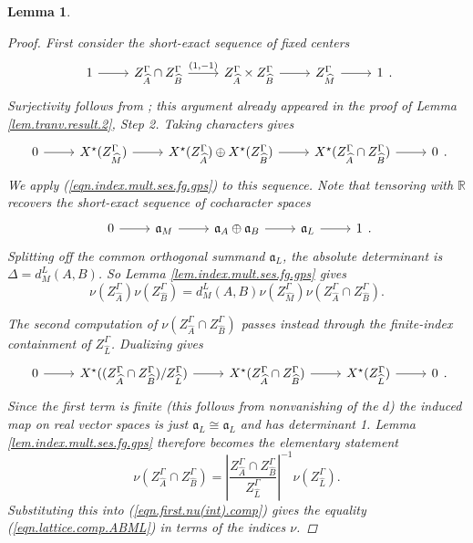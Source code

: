 \documentclass[openany]{amsbook}
\newtheorem{lemma}[theorem]{Lemma}
\theoremstyle{definition}
\theoremstyle{remark}
\numberwithin{equation}{section}
\newcommand{\R}{\mathbb{R}}
\renewcommand{\-}{\operatorname{-}}
\renewcommand{\a}{\mathfrak{a}}
\begin{document}
\begin{lemma}
\begin{proof}
        First consider the short-exact sequence of fixed centers
        $$
            \begin{tikzcd}
                1 \ar[r] & Z_{\widehat{A}}^\Gamma \cap Z_{\widehat{B}}^\Gamma \ar[r, "{(1, -1)}"] & Z_{\widehat{A}}^\Gamma \times Z_{\widehat{B}}^\Gamma \ar[r] & Z_{\widehat{M}}^\Gamma \ar[r] & 1
            \end{tikzcd}.
        $$
        Surjectivity follows from \cite[Lemma 1.1]{arthurtransferwoi}; this argument already appeared in the proof of Lemma \ref{lem.tranv.result.2}, Step 2. Taking characters gives
        $$
            \begin{tikzcd}
                0 \ar[r] & X^\star(Z_{\widehat{M}}^\Gamma) \ar[r] & X^\star(Z_{\widehat{A}}^\Gamma) \oplus X^\star(Z_{\widehat{B}}^\Gamma) \ar[r] & X^\star(Z_{\widehat{A}}^\Gamma \cap Z_{\widehat{B}}^\Gamma) \ar[r] & 0
            \end{tikzcd}.
        $$
        We apply (\ref{eqn.index.mult.ses.fg.gps}) to this sequence. Note that tensoring with $\R$ recovers the short-exact sequence of cocharacter spaces
        $$
            \begin{tikzcd}
                0 \ar[r] & \a_M \ar[r] & \a_A \oplus \a_B \ar[r] & \a_L \ar[r] & 1
            \end{tikzcd}.
        $$
        Splitting off the common orthogonal summand $\a_L$, the absolute determinant is $\Delta = d_M^L(A,B)$. So Lemma \ref{lem.index.mult.ses.fg.gps} gives
    \begin{equation}
            \nu(Z_{\widehat{A}}^\Gamma) \nu(Z_{\widehat{B}}^\Gamma) = d_M^L(A,B) \nu(Z_{\widehat{M}}^\Gamma) \nu(Z_{\widehat{A}}^\Gamma \cap Z_{\widehat{B}}^\Gamma).\label{eqn.first.nu(int).comp}
        \end{equation}

        The second computation of $\nu(Z_{\widehat{A}}^\Gamma \cap Z_{\widehat{B}}^\Gamma)$ passes instead through the finite-index containment of $Z_{\widehat{L}}^\Gamma$. Dualizing gives
        $$
            \begin{tikzcd}
                0 \ar[r] & X^\star((Z_{\widehat{A}}^\Gamma \cap Z_{\widehat{B}}^\Gamma)/Z_{\widehat{L}}^\Gamma) \ar[r] & X^\star(Z_{\widehat{A}}^\Gamma \cap Z_{\widehat{B}}^\Gamma) \ar[r] & X^\star(Z_{\widehat{L}}^\Gamma) \ar[r] & 0
            \end{tikzcd}.
        $$
        Since the first term is finite (this follows from nonvanishing of the $d$) the induced map on real vector spaces is just $\a_L \cong \a_L$ and has determinant 1. Lemma \ref{lem.index.mult.ses.fg.gps} therefore becomes the elementary statement
        $$
            \nu(Z_{\widehat{A}}^\Gamma \cap Z_{\widehat{B}}^\Gamma) = \left|\frac{Z_{\widehat{A}}^\Gamma \cap Z_{\widehat{B}}^\Gamma}{Z_{\widehat{L}}^\Gamma}\right|^{-1} \nu(Z_{\widehat{L}}^\Gamma).
        $$
        Substituting this into (\ref{eqn.first.nu(int).comp}) gives the equality (\ref{eqn.lattice.comp.ABML}) in terms of the indices $\nu$. 
        

\end{proof}
\end{lemma}
\end{document}
